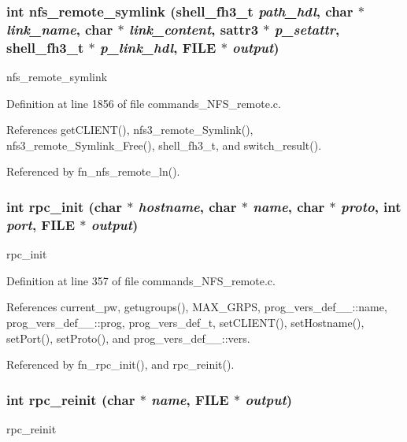\subsubsection{\setlength{\rightskip}{0pt plus 5cm}int nfs\_\-remote\_\-symlink ({\bf shell\_\-fh3\_\-t} {\em path\_\-hdl}, char $\ast$ {\em link\_\-name}, char $\ast$ {\em link\_\-content}, sattr3 $\ast$ {\em p\_\-setattr}, {\bf shell\_\-fh3\_\-t} $\ast$ {\em p\_\-link\_\-hdl}, FILE $\ast$ {\em output})}\label{commands__NFS__remote_8c_a55}


nfs\_\-remote\_\-symlink 

Definition at line 1856 of file commands\_\-NFS\_\-remote.c.

References get\-CLIENT(), nfs3\_\-remote\_\-Symlink(), nfs3\_\-remote\_\-Symlink\_\-Free(), shell\_\-fh3\_\-t, and switch\_\-result().

Referenced by fn\_\-nfs\_\-remote\_\-ln().
\subsubsection{\setlength{\rightskip}{0pt plus 5cm}int rpc\_\-init (char $\ast$ {\em hostname}, char $\ast$ {\em name}, char $\ast$ {\em proto}, int {\em port}, FILE $\ast$ {\em output})}\label{commands__NFS__remote_8c_a29}


rpc\_\-init 

Definition at line 357 of file commands\_\-NFS\_\-remote.c.

References current\_\-pw, getugroups(), MAX\_\-GRPS, prog\_\-vers\_\-def\_\-\_\-::name, prog\_\-vers\_\-def\_\-\_\-::prog, prog\_\-vers\_\-def\_\-t, set\-CLIENT(), set\-Hostname(), set\-Port(), set\-Proto(), and prog\_\-vers\_\-def\_\-\_\-::vers.

Referenced by fn\_\-rpc\_\-init(), and rpc\_\-reinit().
\subsubsection{\setlength{\rightskip}{0pt plus 5cm}int rpc\_\-reinit (char $\ast$ {\em name}, FILE $\ast$ {\em output})}\label{commands__NFS__remote_8c_a30}


rpc\_\-reinit 

